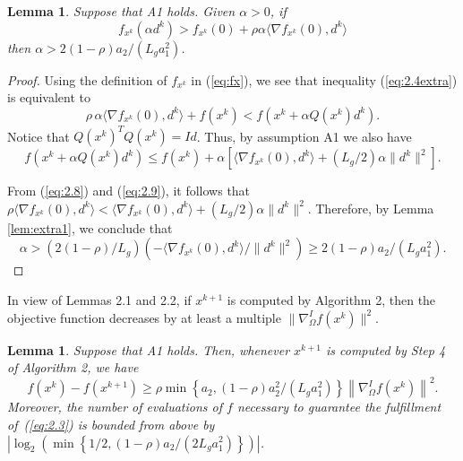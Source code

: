 \documentclass[11pt]{article}
\newtheorem{lemma}[theorem]{Lemma}
\begin{document}
\begin{lemma}
\label{lem:2.0}
Suppose that A1 holds. Given $\alpha>0$, if 
\begin{equation}
f_{x^{k}}(\alpha d^{k})>f_{x^{k}}(0)+\rho\alpha\langle\nabla f_{x^{k}}(0),d^{k}\rangle
\label{eq:2.4extra}
\end{equation}
then $\alpha > 2(1-\rho)a_{2} / (L_{g}a_{1}^{2})$.
\end{lemma}

\begin{proof}
Using the definition of $f_{x^{k}}$ in (\ref{eq:fx}), we see that inequality (\ref{eq:2.4extra}) is equivalent to
\begin{equation}
\rho \, \alpha\langle\nabla f_{x^{k}}(0),d^{k}\rangle+f(x^{k})<f\left(x^{k}+\alpha Q(x^{k})d^{k}\right).
\label{eq:2.8}
\end{equation}
Notice that $Q(x^{k})^{T}Q(x^{k})=Id$. Thus, by assumption A1 we also have
\begin{equation} \label{eq:2.9}
f(x^{k}+\alpha Q(x^{k})d^{k}) \leq
f(x^{k})+\alpha[\langle\nabla f_{x^{k}}(0),d^{k}\rangle+(L_{g}/2)\alpha\|d^{k}\|^{2}].
\end{equation}

From (\ref{eq:2.8}) and (\ref{eq:2.9}), it follows that $\rho \langle \nabla f_{x^{k}}(0), d^{k} \rangle < \langle \nabla f_{x^{k}}(0), d^{k} \rangle + (L_{g}/2) \alpha \|d^{k}\|^{2}$. Therefore, by Lemma \ref{lem:extra1}, we conclude that
\[
\alpha > \left( 2(1-\rho) / L_{g} \right) \left(-\langle \nabla f_{x^{k}}(0), d^{k} \rangle / \|d^{k}\|^{2} \right) \geq 2(1-\rho)a_{2} / (L_{g}a_{1}^{2}).
\]
\end{proof}

In view of Lemmas 2.1 and 2.2, if $x^{k+1}$ is computed by Algorithm 2, then the objective function decreases by at least a multiple $\|\nabla_{\Omega}^{I}f(x^{k})\|^{2}$.

\begin{lemma}
\label{lem:2.1}
Suppose that A1 holds. Then, whenever $x^{k+1}$ is computed by Step 4 of Algorithm 2, we have
\begin{equation}
f(x^{k})-f(x^{k+1})\geq\rho\min\left\{a_{2},(1-\rho)a_{2}^{2}/(L_{g}a_{1}^{2})\right\}\left\|\nabla_{\Omega}^{I}f(x^{k})\right\|^{2}.
\label{eq:2.5}
\end{equation}
Moreover, the number of evaluations of $f$ necessary to guarantee the fulfillment of~(\ref{eq:2.3}) is bounded from above by $\left|\log_{2}\left(\min\left\{1/2,(1-\rho)a_{2}/(2L_{g}a_{1}^{2})\right\}\right)\right|$.
\end{lemma}
\end{document}
